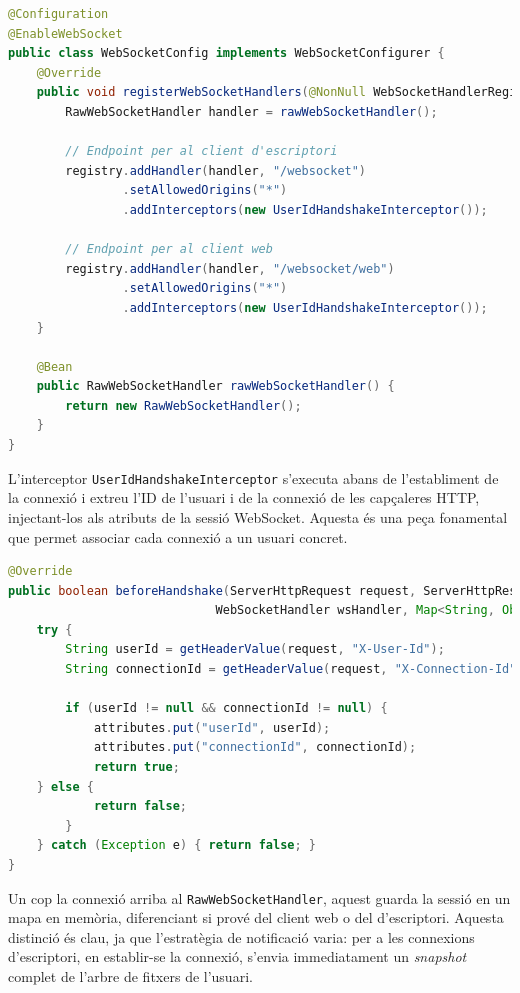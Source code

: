 \begin{lstlisting}[language=Java, caption={Configuració del WebSocket a `SyncService`}]
@Configuration
@EnableWebSocket
public class WebSocketConfig implements WebSocketConfigurer {
    @Override
    public void registerWebSocketHandlers(@NonNull WebSocketHandlerRegistry registry) {
        RawWebSocketHandler handler = rawWebSocketHandler();
        
        // Endpoint per al client d'escriptori
        registry.addHandler(handler, "/websocket")
                .setAllowedOrigins("*")
                .addInterceptors(new UserIdHandshakeInterceptor());
                
        // Endpoint per al client web
        registry.addHandler(handler, "/websocket/web")
                .setAllowedOrigins("*")
                .addInterceptors(new UserIdHandshakeInterceptor());
    }
    
    @Bean
    public RawWebSocketHandler rawWebSocketHandler() {
        return new RawWebSocketHandler();
    }
}
\end{lstlisting}

L'interceptor \texttt{UserIdHandshakeInterceptor} s'executa abans de l'establiment de la connexió i extreu l'ID de l'usuari i de la connexió de les capçaleres HTTP, injectant-los als atributs de la sessió WebSocket. Aquesta és una peça fonamental que permet associar cada connexió a un usuari concret.

\begin{lstlisting}[language=Java, caption={Interceptor per extreure IDs d'usuari a `UserIdHandshakeInterceptor`}]
@Override
public boolean beforeHandshake(ServerHttpRequest request, ServerHttpResponse response, 
                             WebSocketHandler wsHandler, Map<String, Object> attributes) throws Exception {
    try {
        String userId = getHeaderValue(request, "X-User-Id");
        String connectionId = getHeaderValue(request, "X-Connection-Id");
        
        if (userId != null && connectionId != null) {
            attributes.put("userId", userId);
            attributes.put("connectionId", connectionId);
            return true;
    } else {
            return false;
        }
    } catch (Exception e) { return false; }
}
\end{lstlisting}

Un cop la connexió arriba al \texttt{RawWebSocketHandler}, aquest guarda la sessió en un mapa en memòria, diferenciant si prové del client web o del d'escriptori. Aquesta distinció és clau, ja que l'estratègia de notificació varia: per a les connexions d'escriptori, en establir-se la connexió, s'envia immediatament un \textit{snapshot} complet de l'arbre de fitxers de l'usuari.

